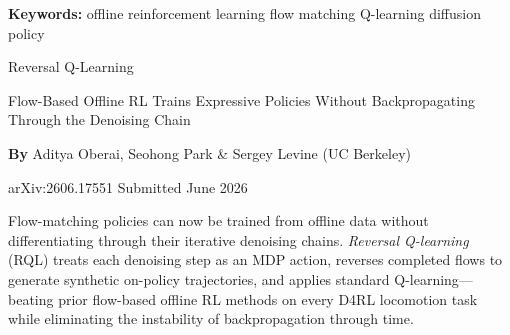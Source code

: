 \documentclass[10pt,twocolumn]{article}
\begin{document}
\setlength{\parindent}{0pt}
\setlength{\parskip}{4pt}

{\small\color{keywordgray}\textbf{Keywords:}
  offline reinforcement learning \textbullet{}
  flow matching \textbullet{}
  Q-learning \textbullet{}
  diffusion policy}\par\vspace{4pt}

{\LARGE\bfseries\raggedright
  Reversal Q-Learning}\par\vspace{4pt}

{\large\itshape\raggedright
  Flow-Based Offline RL Trains Expressive Policies Without Backpropagating Through
  the Denoising Chain}\par\vspace{6pt}

{\small\textbf{By} Aditya Oberai, Seohong Park \& Sergey Levine
  (UC Berkeley)}\par\vspace{2pt}

{\small\color{keywordgray}arXiv:2606.17551 \textbullet{} Submitted June 2026}
\par\vspace{2pt}\noindent{\color{rulered}\rule{\columnwidth}{0.6pt}}\vspace{6pt}

Flow-matching policies can now be trained from offline data without differentiating
through their iterative denoising chains. \textit{Reversal Q-learning} (RQL) treats
each denoising step as an MDP action, reverses completed flows to generate synthetic
on-policy trajectories, and applies standard Q-learning---beating prior flow-based
offline RL methods on every D4RL locomotion task while eliminating the instability
of backpropagation through time.
\end{document}

